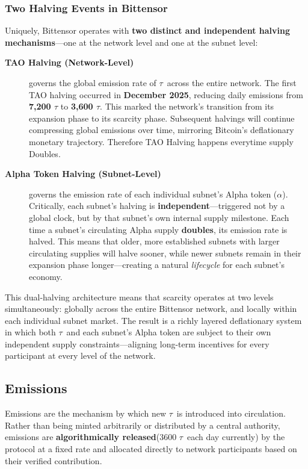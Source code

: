 \documentclass[12pt, a4paper, oneside]{report}
\newcommand{\TAO}{$\tau$}            %
\theoremstyle{definition}
\begin{document}
\subsubsection*{Two Halving Events in Bittensor}

Uniquely, Bittensor operates with \textbf{two distinct and independent halving 
mechanisms}—one at the network level and one at the subnet level:

\begin{description}
  \item[\textbf{TAO Halving (Network-Level)}] governs the global emission rate of 
  \TAO\ across the entire network. The first TAO halving occurred in 
  \textbf{December 2025}, reducing daily emissions from \textbf{7,200 \TAO} to 
  \textbf{3,600 \TAO}. This marked the network's transition from its expansion 
  phase to its scarcity phase. Subsequent halvings will continue compressing 
  global emissions over time, mirroring Bitcoin's deflationary monetary trajectory. Therefore TAO Halving happens everytime supply Doubles.

  \item[\textbf{Alpha Token Halving (Subnet-Level)}] governs the emission rate of 
  each individual subnet's Alpha token ($\alpha$). Critically, each subnet's halving 
  is \textbf{independent}—triggered not by a global clock, but by that subnet's own 
  internal supply milestone. Each time a subnet's circulating Alpha supply 
  \textbf{doubles}, its emission rate is halved. This means that older, more 
  established subnets with larger circulating supplies will halve sooner, while 
  newer subnets remain in their expansion phase longer—creating a natural 
  \emph{lifecycle} for each subnet's economy.
\end{description}

This dual-halving architecture means that scarcity operates at two levels 
simultaneously: globally across the entire Bittensor network, and locally within 
each individual subnet market. The result is a richly layered deflationary system 
in which both \TAO\ and each subnet's Alpha token are subject to their own 
independent supply constraints—aligning long-term incentives for every participant 
at every level of the network.




\subsection{Emissions}

Emissions are the mechanism by which new \TAO\ is introduced into circulation. 
Rather than being minted arbitrarily or distributed by a central authority, 
emissions are \textbf{algorithmically released}(3600 \TAO\ each day currently)  by the protocol at a fixed rate 
and allocated directly to network participants based on their verified contribution.\\[0.4cm]
\end{document}

